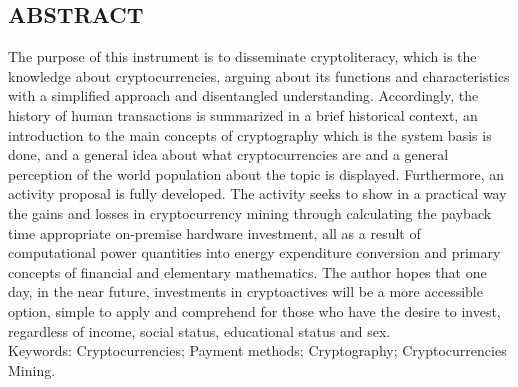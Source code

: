 \begin{KeepFromToc}
\chapter*{ABSTRACT}
\nohyphens{
The purpose of this instrument is to disseminate cryptoliteracy, which is the knowledge about cryptocurrencies, arguing about its functions and characteristics with a simplified approach and disentangled understanding. Accordingly, the history of human transactions is summarized in a brief historical context, an introduction to the main concepts of cryptography which is the system basis is done, and a general idea about what} cryptocurrencies are and a general perception of the world population about the topic is displayed. Furthermore, an activity proposal is fully developed. The activity seeks to show in a practical way the gains and losses in cryptocurrency mining through calculating the payback time appropriate on-premise hardware investment, all as a result of computational power quantities into energy expenditure conversion and primary concepts of financial and elementary mathematics. The author hopes that one day, in the near future, investments in cryptoactives will be a more accessible option, simple to apply and comprehend for those who have the desire to invest, regardless of income, social status, educational status and sex.\\

\noindent
Keywords: Cryptocurrencies; Payment methods; Cryptography; Cryptocurrencies Mining.

\end{KeepFromToc}
